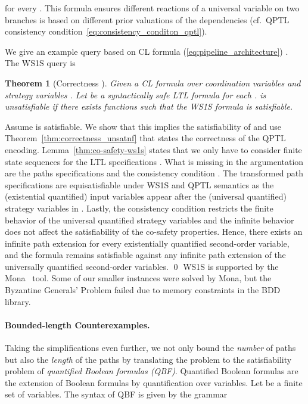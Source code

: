 \documentclass{LMCS}
\theoremstyle{plain}\newtheorem{theorem}[thm]{Theorem}
\theoremstyle{plain}\newtheorem{lemma}[thm]{Lemma}
\theoremstyle{plain}\newtheorem{proposition}[thm]{Proposition}
\theoremstyle{plain}\newtheorem{corollary}[thm]{Corollary}
\theoremstyle{definition}\newtheorem{definition}{Definition}[section]
\begin{document}
for every .
This formula ensures different reactions of a universal variable on two branches is based on different prior valuations of the dependencies (cf.~QPTL consistency condition~\eqref{eq:consistency_conditon_qptl}).

We give an example query based on CL formula (\ref{eq:pipeline_architecture}) .
The WS1S query is


\begin{theorem}[Correctness ] \label{thm:correctness_ws1s_encoding}
  Given a CL formula  over coordination variables  and strategy variables .
  Let  be a syntactically safe LTL formula for each .
   is unsatisfiable if there exists functions  such that the WS1S formula  is satisfiable.
\end{theorem}
\proof
Assume  is satisfiable.
We show that this implies the satisfiability of  and use Theorem~\ref{thm:correctness_unsatnf} that states the correctness of the QPTL encoding.
Lemma~\ref{thm:co-safety-ws1s} states that we only have to consider finite state sequences for the LTL specifications .
What is missing in the argumentation are the paths specifications  and the consistency condition .
The transformed path specifications are equisatisfiable under WS1S and QPTL semantics as the (existential quantified) input variables appear after the (universal quantified) strategy variables in .
Lastly, the consistency condition restricts the finite behavior of the universal quantified strategy variables and the infinite behavior does not affect the satisfiability of the co-safety properties.
Hence, there exists an infinite path extension for every existentially quantified second-order variable, and the formula remains satisfiable against any infinite path extension of the universally quantified second-order variables.
\qed\noindent
WS1S is supported by the Mona~\cite{DBLP:conf/tacas/HenriksenJJKPRS95} tool.
Some of our smaller instances were solved by Mona, but the Byzantine Generals' Problem failed due to memory constraints in the BDD library.


\paragraph{\bf Bounded-length Counterexamples.}
Taking the simplifications even further, we not only bound the \emph{number} of paths but also the \emph{length} of the paths by translating the problem to the satisfiability problem of \emph{quantified Boolean formulas (QBF)}.
Quantified Boolean formulas are the extension of Boolean formulas by quantification over variables.
Let  be a finite set of variables.
The syntax of QBF is given by the grammar
\end{document}
